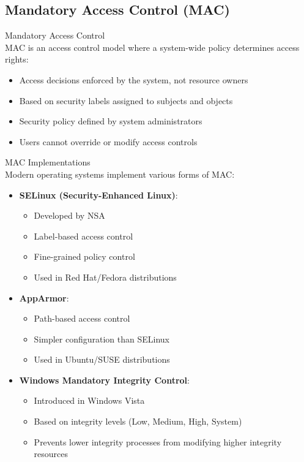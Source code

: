 \subsection{Mandatory Access Control (MAC)}

\begin{definition}{Mandatory Access Control}\\
MAC is an access control model where a system-wide policy determines access rights:
\begin{itemize}
    \item Access decisions enforced by the system, not resource owners
    \item Based on security labels assigned to subjects and objects
    \item Security policy defined by system administrators
    \item Users cannot override or modify access controls
\end{itemize}
\end{definition}

\begin{concept}{MAC Implementations}\\
Modern operating systems implement various forms of MAC:
\begin{itemize}
    \item \textbf{SELinux (Security-Enhanced Linux)}:
    \begin{itemize}
        \item Developed by NSA
        \item Label-based access control
        \item Fine-grained policy control
        \item Used in Red Hat/Fedora distributions
    \end{itemize}
    \item \textbf{AppArmor}:
    \begin{itemize}
        \item Path-based access control
        \item Simpler configuration than SELinux
        \item Used in Ubuntu/SUSE distributions
    \end{itemize}
    \item \textbf{Windows Mandatory Integrity Control}:
    \begin{itemize}
        \item Introduced in Windows Vista
        \item Based on integrity levels (Low, Medium, High, System)
        \item Prevents lower integrity processes from modifying higher integrity resources
    \end{itemize}
\end{itemize}
\end{concept}

